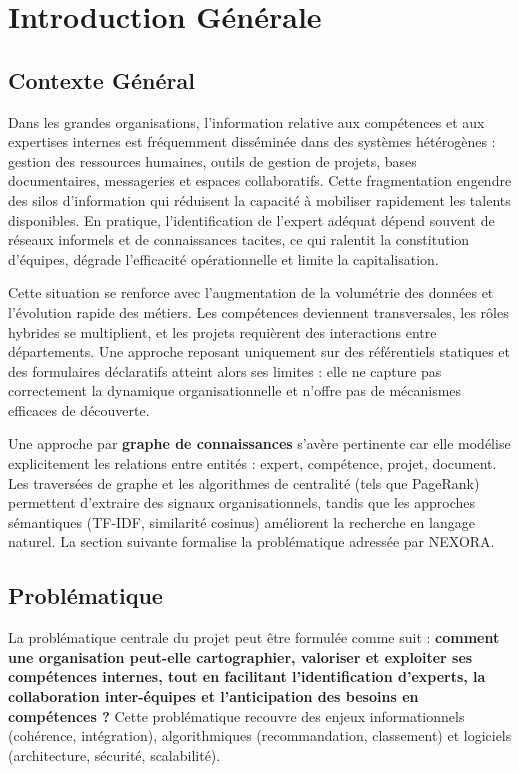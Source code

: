 \documentclass[12pt,a4paper]{report}
\begin{document}
\chapter{Introduction Générale}

\section{Contexte Général}
Dans les grandes organisations, l'information relative aux compétences et aux expertises internes est fréquemment disséminée dans des systèmes hétérogènes : gestion des ressources humaines, outils de gestion de projets, bases documentaires, messageries et espaces collaboratifs. Cette fragmentation engendre des silos d'information qui réduisent la capacité à mobiliser rapidement les talents disponibles. En pratique, l'identification de l'expert adéquat dépend souvent de réseaux informels et de connaissances tacites, ce qui ralentit la constitution d'équipes, dégrade l'efficacité opérationnelle et limite la capitalisation.

Cette situation se renforce avec l'augmentation de la volumétrie des données et l'évolution rapide des métiers. Les compétences deviennent transversales, les rôles hybrides se multiplient, et les projets requièrent des interactions entre départements. Une approche reposant uniquement sur des référentiels statiques et des formulaires déclaratifs atteint alors ses limites : elle ne capture pas correctement la dynamique organisationnelle et n'offre pas de mécanismes efficaces de découverte.

Une approche par \textbf{graphe de connaissances} s'avère pertinente car elle modélise explicitement les relations entre entités : expert, compétence, projet, document. Les traversées de graphe et les algorithmes de centralité (tels que PageRank) permettent d'extraire des signaux organisationnels, tandis que les approches sémantiques (TF-IDF, similarité cosinus) améliorent la recherche en langage naturel. La section suivante formalise la problématique adressée par NEXORA.

\section{Problématique}
La problématique centrale du projet peut être formulée comme suit : \textbf{comment une organisation peut-elle cartographier, valoriser et exploiter ses compétences internes, tout en facilitant l'identification d'experts, la collaboration inter-équipes et l'anticipation des besoins en compétences ?} Cette problématique recouvre des enjeux informationnels (cohérence, intégration), algorithmiques (recommandation, classement) et logiciels (architecture, sécurité, scalabilité).
\end{document}
